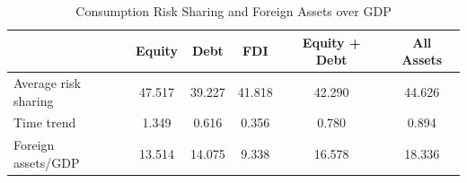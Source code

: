 \begin{table}[!htbp] \centering
\caption{Consumption Risk Sharing and Foreign Assets over GDP}
\label{tab:table5_consumption_assets}
\begin{tabular}{lccccc}
\hline\hline
 & Equity & Debt & FDI & Equity + Debt & All Assets \\
\hline
Average risk sharing & 47.517 & 39.227 & 41.818 & 42.290 & 44.626 \\
Time trend & 1.349 & 0.616 & 0.356 & 0.780 & 0.894 \\
Foreign assets/GDP & 13.514 & 14.075 & 9.338 & 16.578 & 18.336 \\
\hline\hline
\end{tabular}
\end{table}
